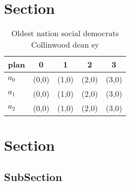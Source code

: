 \documentclass[a4paper]{article}
\begin{document}
\section{Section}

\begin{table}
\begin{adjustbox}{width=0.6\columnwidth}
\begin{tabular}{|l|l|l|l|l|}
\hline
\textbf{plan} & \multicolumn{1}{c|}{\textbf{0}} & \multicolumn{1}{c|}{\textbf{1}} & \multicolumn{1}{c|}{\textbf{2}} & \multicolumn{1}{c|}{\textbf{3}} \\ \hline
\textbf{$a_0$}  & (0,0) & (1,0) & (2,0) & (3,0) \\ \hline
\textbf{$a_1$}  & (0,0) & (1,0) & (2,0) & (3,0) \\ \hline
\textbf{$a_2$}  & (0,0) & (1,0) & (2,0) & (3,0) \\ \hline
\end{tabular}
\end{adjustbox}
\caption{Oldest nation social democrats Collinwood dean sy
}
\end{table}

\section{Section}

\subsection{SubSection}
\end{document}
